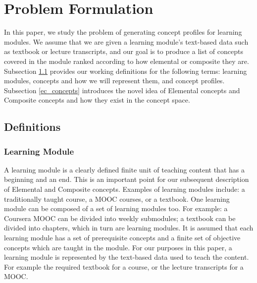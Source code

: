 \section{Problem Formulation}



In this paper, we study the problem of generating concept profiles for learning modules. We assume that we are given a learning module's text-based data such as textbook or lecture transcripts, and our goal is to produce a list of concepts covered in the module ranked according to how elemental or composite they are. Subsection \ref{definitions} provides our working definitions for the following terms: learning modules, concepts and how we will represent them, and concept profiles. Subsection \ref{ec_concepts} introduces the novel idea of Elemental concepts and Composite concepts and how they exist in the concept space.

\subsection{Definitions}\label{definitions}
\subsubsection{Learning Module}\label{learning_module}
A learning module is a clearly defined finite unit of teaching content that has a beginning and an end. This is an important point for our subsequent description of Elemental and Composite concepts. Examples of learning modules include: a traditionally taught course, a MOOC courses, or a textbook. One learning module can be composed of a set of learning modules too. For example: a Coursera MOOC can be divided into weekly submodules; a textbook can be divided into chapters, which in turn are learning modules.
It is assumed that each learning module has a set of prerequisite concepts and a finite set of objective concepts which are taught in the module.
For our purposes in this paper, a learning module is represented by the text-based data used to teach the content. For example the required textbook for a course, or the lecture transcripts for a MOOC.

